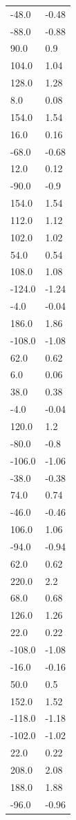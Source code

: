 \begin{longtable}{ll}
-48.0 & -0.48 \\
-88.0 & -0.88 \\
90.0 & 0.9 \\
104.0 & 1.04 \\
128.0 & 1.28 \\
8.0 & 0.08 \\
154.0 & 1.54 \\
16.0 & 0.16 \\
-68.0 & -0.68 \\
12.0 & 0.12 \\
-90.0 & -0.9 \\
154.0 & 1.54 \\
112.0 & 1.12 \\
102.0 & 1.02 \\
54.0 & 0.54 \\
108.0 & 1.08 \\
-124.0 & -1.24 \\
-4.0 & -0.04 \\
186.0 & 1.86 \\
-108.0 & -1.08 \\
62.0 & 0.62 \\
6.0 & 0.06 \\
38.0 & 0.38 \\
-4.0 & -0.04 \\
120.0 & 1.2 \\
-80.0 & -0.8 \\
-106.0 & -1.06 \\
-38.0 & -0.38 \\
74.0 & 0.74 \\
-46.0 & -0.46 \\
106.0 & 1.06 \\
-94.0 & -0.94 \\
62.0 & 0.62 \\
220.0 & 2.2 \\
68.0 & 0.68 \\
126.0 & 1.26 \\
22.0 & 0.22 \\
-108.0 & -1.08 \\
-16.0 & -0.16 \\
50.0 & 0.5 \\
152.0 & 1.52 \\
-118.0 & -1.18 \\
-102.0 & -1.02 \\
22.0 & 0.22 \\
208.0 & 2.08 \\
188.0 & 1.88 \\
-96.0 & -0.96 \\

\end{longtable}
